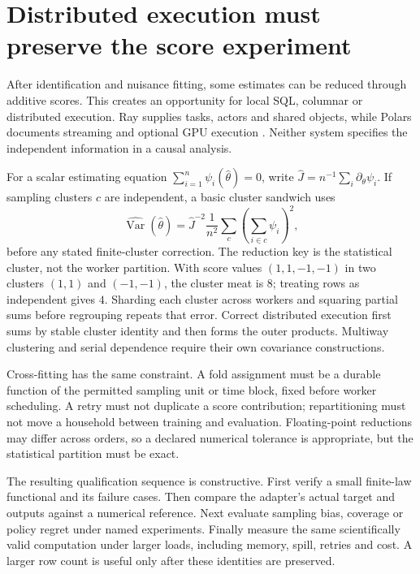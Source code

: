 \section{Distributed execution must preserve the score experiment}
\label{r3:software-execution}

After identification and nuisance fitting, some estimates can be reduced
through additive scores. This creates an opportunity for local SQL,
columnar or distributed execution. Ray supplies tasks, actors and shared
objects, while Polars documents streaming and optional GPU execution
\citep{sw_ray,sw_polars}. Neither system specifies the independent
information in a causal analysis.

For a scalar estimating equation $\sum_{i=1}^n\psi_i(\widehat\theta)=0$,
write $\widehat J=n^{-1}\sum_i\partial_\theta\psi_i$.
If sampling clusters $c$ are independent, a basic cluster sandwich uses
\begin{equation}
 \widehat{\operatorname{Var}}(\widehat\theta)=
 \widehat J^{-2}\frac1{n^2}\sum_c
       \left(\sum_{i\in c}\psi_i\right)^2,
 \label{r3:software-cluster-reduction}
\end{equation}
before any stated finite-cluster correction. The reduction key is the
statistical cluster, not the worker partition. With score values
$(1,1,-1,-1)$ in two clusters $(1,1)$ and $(-1,-1)$, the cluster meat is
$8$; treating rows as independent gives $4$. Sharding each cluster across
workers and squaring partial sums before regrouping repeats that error.
Correct distributed execution first sums by stable cluster identity and
then forms the outer products. Multiway clustering and serial dependence
require their own covariance constructions.

Cross-fitting has the same constraint. A fold assignment must be a durable
function of the permitted sampling unit or time block, fixed before
worker scheduling. A retry must not duplicate a score contribution;
repartitioning must not move a household between training and evaluation.
Floating-point reductions may differ across orders, so a declared numerical
tolerance is appropriate, but the statistical partition must be exact.

The resulting qualification sequence is constructive. First verify a
small finite-law functional and its failure cases. Then compare the
adapter's actual target and outputs against a numerical reference.
Next evaluate sampling bias, coverage or policy regret under named
experiments. Finally measure the same scientifically valid computation
under larger loads, including memory, spill, retries and cost. A larger
row count is useful only after these identities are preserved.

